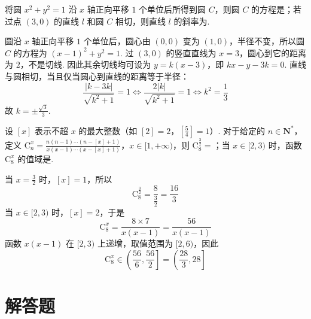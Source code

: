 \begin{problem}
将圆 \(x^{2} + y^{2} = 1\) 沿 \(x\) 轴正向平移 \(1\) 个单位后所得到圆 \(C\)，则圆 \(C\) 的方程是\fillinblank{}；若过点 \((3,0)\) 的直线 \(l\) 和圆 \(C\) 相切，则直线 \(l\) 的斜率为\fillinblank{}.

\begin{solution}
圆沿 \(x\) 轴正向平移 \(1\) 个单位后，圆心由 \((0,0)\) 变为 \((1,0)\)，半径不变，所以圆 \(C\) 的方程为
\((x-1)^2+y^2=1\). 过 \((3,0)\) 的竖直直线为 \(x=3\)，圆心到它的距离为 \(2\)，不是切线. 因此其余切线均可设为 \(y=k(x-3)\)，即
\(kx-y-3k=0\). 直线与圆相切，当且仅当圆心到直线的距离等于半径：
\[
\frac{|k-3k|}{\sqrt{k^2+1}}=1
\iff \frac{2|k|}{\sqrt{k^2+1}}=1
\iff k^2=\frac13
\]
故 \(k=\pm\frac{\sqrt3}{3}\).
\end{solution}
\end{problem}

\begin{problem}
设 \([x]\) 表示不超 \(x\) 的最大整数（如 \([2] = 2\)，\(\left[\frac{5}{4}\right] = 1\)）. 对于给定的 \(n \in \mathbf{N}^*\)，定义 \(\mathrm C_n^x = \frac{n(n - 1) \cdots (n - [x] + 1)}{x(x - 1) \cdots (x - [x] + 1)}\)，\(x \in [1, +\infty)\)，则 \(\mathrm C_8^{\frac{3}{2}} =\)\fillinblank{}；当 \(x \in [2, 3)\) 时，函数 \(\mathrm C_8^x\) 的值域是\fillinblank{}.
\answer{\(\frac{16}{3}\)；\(\left(\frac{28}{3},28\right]\)}

\begin{solution}
当 \(x=\frac32\) 时，\([x]=1\)，所以
\[
\mathrm C_8^{\frac32}=\frac8{\frac32}=\frac{16}{3}
\]
当 \(x\in[2,3)\) 时，\([x]=2\)，于是
\[
\mathrm C_8^x=\frac{8\times7}{x(x-1)}=\frac{56}{x(x-1)}
\]
函数 \(x(x-1)\) 在 \([2,3)\) 上递增，取值范围为 \([2,6)\)，因此
\[
\mathrm C_8^x\in\left(\frac{56}{6},\frac{56}{2}\right]
=\left(\frac{28}{3},28\right]
\]
\end{solution}
\end{problem}

\section{解答题}

